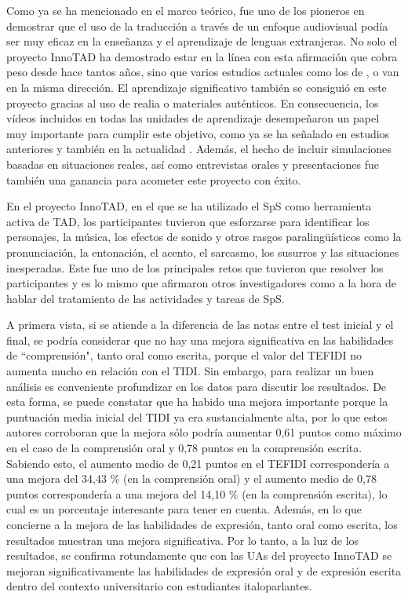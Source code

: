 \documentclass[spanish]{textolivre}
\begin{document}
Como ya se ha mencionado en el marco teórico, \textcite{vanderplank1988} fue uno de los pioneros en demostrar que el uso de la traducción a través de un enfoque audiovisual podía ser muy eficaz en la enseñanza y el aprendizaje de lenguas extranjeras. No solo el proyecto InnoTAD ha demostrado estar en la línea con esta afirmación que cobra peso desde hace tantos años, sino que varios estudios actuales como los de \textcite{talavan2019}, \textcite{talavan2022} o \textcite{couto-cantero-trovato2023} van en la misma dirección. El aprendizaje significativo también se consiguió en este proyecto gracias al uso de realia o materiales auténticos. En consecuencia, los vídeos incluidos en todas las unidades de aprendizaje desempeñaron un papel muy importante para cumplir este objetivo, como ya se ha señalado en estudios anteriores \cite{navarro-pablo2019} y también en la actualidad \cite{couto-cantero2023}. Además, el hecho de incluir simulaciones basadas en situaciones reales, así como entrevistas orales y presentaciones \cite{garcia-carbonell2001, angellini2012} fue también una ganancia para acometer este proyecto con éxito.

En el proyecto InnoTAD, en el que se ha utilizado el SpS como herramienta activa de TAD, los participantes tuvieron que esforzarse para identificar los personajes, la música, los efectos de sonido y otros rasgos paralingüísticos como la pronunciación, la entonación, el acento, el sarcasmo, los susurros y las situaciones inesperadas. Este fue uno de los principales retos que tuvieron que resolver los participantes y es lo mismo que afirmaron otros investigadores como \textcite{zarate2021} a la hora de hablar del tratamiento de las actividades y tareas de SpS. 

A primera vista, si se atiende a la diferencia de las notas entre el test inicial y el final, se podría considerar que no hay una mejora significativa en las habilidades de ``comprensión", tanto oral como escrita, porque el valor del TEFIDI no aumenta mucho en relación con el TIDI. Sin embargo, para realizar un buen análisis es conveniente profundizar en los datos para discutir los resultados. De esta forma, se puede constatar que ha habido una mejora importante porque la puntuación media inicial del TIDI ya era sustancialmente alta, por lo que estos autores corroboran que la mejora sólo podría aumentar 0,61 puntos como máximo en el caso de la comprensión oral y 0,78 puntos en la comprensión escrita. Sabiendo esto, el aumento medio de 0,21 puntos en el TEFIDI correspondería a una mejora del 34,43 \% (en la comprensión oral) y el aumento medio de 0,78 puntos correspondería a una mejora del 14,10 \% (en la comprensión escrita), lo cual es un porcentaje interesante para tener en cuenta. Además, en lo que concierne a la mejora de las habilidades de expresión, tanto oral como escrita, los resultados muestran una mejora significativa. Por lo tanto, a la luz de los resultados, se confirma rotundamente que con las UAs del proyecto InnoTAD se mejoran significativamente las habilidades de expresión oral y de expresión escrita dentro del contexto universitario con estudiantes italoparlantes.
\end{document}
